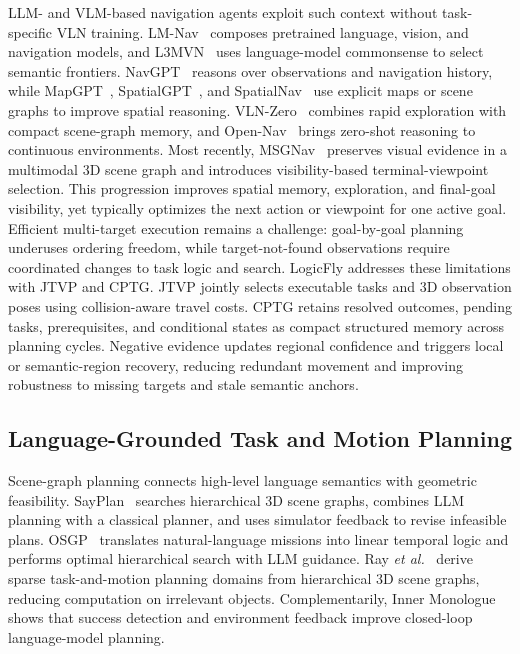 \documentclass[letterpaper,10pt,journal]{IEEEtran}
\begin{document}
LLM- and VLM-based navigation agents exploit such context without task-specific VLN training. LM-Nav~\cite{shah2023lmnav} composes pretrained language, vision, and navigation models, and L3MVN~\cite{yu2023l3mvn} uses language-model commonsense to select semantic frontiers. NavGPT~\cite{zhou2024navgpt} reasons over observations and navigation history, while MapGPT~\cite{chen2024mapgpt}, SpatialGPT~\cite{jiang2025spatialgpt}, and SpatialNav~\cite{zhang2026spatialnav} use explicit maps or scene graphs to improve spatial reasoning. VLN-Zero~\cite{bhatt2025vlnzero} combines rapid exploration with compact scene-graph memory, and Open-Nav~\cite{qiao2025opennav} brings zero-shot reasoning to continuous environments. Most recently, MSGNav~\cite{huang2026msgnav} preserves visual evidence in a multimodal 3D scene graph and introduces visibility-based terminal-viewpoint selection. This progression improves spatial memory, exploration, and final-goal visibility, yet typically optimizes the next action or viewpoint for one active goal. Efficient multi-target execution remains a challenge: goal-by-goal planning underuses ordering freedom, while target-not-found observations require coordinated changes to task logic and search. LogicFly addresses these limitations with JTVP and CPTG. JTVP jointly selects executable tasks and 3D observation poses using collision-aware travel costs. CPTG retains resolved outcomes, pending tasks, prerequisites, and conditional states as compact structured memory across planning cycles. Negative evidence updates regional confidence and triggers local or semantic-region recovery, reducing redundant movement and improving robustness to missing targets and stale semantic anchors.

\subsection{Language-Grounded Task and Motion Planning}

Scene-graph planning connects high-level language semantics with geometric feasibility. SayPlan~\cite{rana2023sayplan} searches hierarchical 3D scene graphs, combines LLM planning with a classical planner, and uses simulator feedback to revise infeasible plans. OSGP~\cite{dai2024osgp} translates natural-language missions into linear temporal logic and performs optimal hierarchical search with LLM guidance. Ray \emph{et al.}~\cite{ray2024tamp} derive sparse task-and-motion planning domains from hierarchical 3D scene graphs, reducing computation on irrelevant objects. Complementarily, Inner Monologue~\cite{huang2023innermonologue} shows that success detection and environment feedback improve closed-loop language-model planning.
\end{document}
